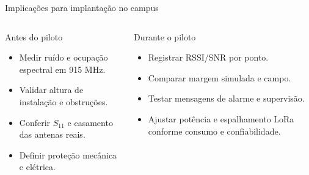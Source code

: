 \documentclass[aspectratio=169]{beamer}
\begin{document}
\begin{frame}{Implicações para implantação no campus}
\small
\begin{columns}[T,onlytextwidth]
\begin{block}{Antes do piloto}
\begin{itemize}
  \item Medir ruído e ocupação espectral em 915 MHz.
  \item Validar altura de instalação e obstruções.
  \item Conferir $S_{11}$ e casamento das antenas reais.
  \item Definir proteção mecânica e elétrica.
\end{itemize}
\end{block}
\begin{block}{Durante o piloto}
\begin{itemize}
  \item Registrar RSSI/SNR por ponto.
  \item Comparar margem simulada e campo.
  \item Testar mensagens de alarme e supervisão.
  \item Ajustar potência e espalhamento LoRa conforme consumo e confiabilidade.
\end{itemize}
\end{block}
\end{columns}
\end{frame}

\end{document}
